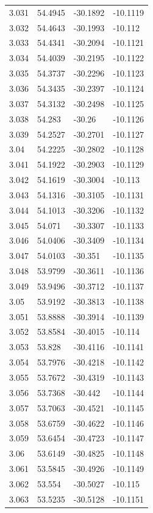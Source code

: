 \begin{tabular}{llll}
3.031 & 54.4945 & -30.1892 & -10.1119 \\
3.032 & 54.4643 & -30.1993 & -10.112 \\
3.033 & 54.4341 & -30.2094 & -10.1121 \\
3.034 & 54.4039 & -30.2195 & -10.1122 \\
3.035 & 54.3737 & -30.2296 & -10.1123 \\
3.036 & 54.3435 & -30.2397 & -10.1124 \\
3.037 & 54.3132 & -30.2498 & -10.1125 \\
3.038 & 54.283 & -30.26 & -10.1126 \\
3.039 & 54.2527 & -30.2701 & -10.1127 \\
3.04 & 54.2225 & -30.2802 & -10.1128 \\
3.041 & 54.1922 & -30.2903 & -10.1129 \\
3.042 & 54.1619 & -30.3004 & -10.113 \\
3.043 & 54.1316 & -30.3105 & -10.1131 \\
3.044 & 54.1013 & -30.3206 & -10.1132 \\
3.045 & 54.071 & -30.3307 & -10.1133 \\
3.046 & 54.0406 & -30.3409 & -10.1134 \\
3.047 & 54.0103 & -30.351 & -10.1135 \\
3.048 & 53.9799 & -30.3611 & -10.1136 \\
3.049 & 53.9496 & -30.3712 & -10.1137 \\
3.05 & 53.9192 & -30.3813 & -10.1138 \\
3.051 & 53.8888 & -30.3914 & -10.1139 \\
3.052 & 53.8584 & -30.4015 & -10.114 \\
3.053 & 53.828 & -30.4116 & -10.1141 \\
3.054 & 53.7976 & -30.4218 & -10.1142 \\
3.055 & 53.7672 & -30.4319 & -10.1143 \\
3.056 & 53.7368 & -30.442 & -10.1144 \\
3.057 & 53.7063 & -30.4521 & -10.1145 \\
3.058 & 53.6759 & -30.4622 & -10.1146 \\
3.059 & 53.6454 & -30.4723 & -10.1147 \\
3.06 & 53.6149 & -30.4825 & -10.1148 \\
3.061 & 53.5845 & -30.4926 & -10.1149 \\
3.062 & 53.554 & -30.5027 & -10.115 \\
3.063 & 53.5235 & -30.5128 & -10.1151 \\

\end{tabular}
